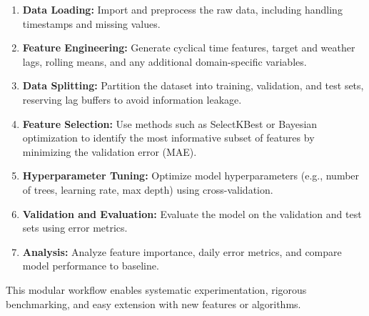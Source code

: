 \begin{enumerate}
    \item \textbf{Data Loading:} Import and preprocess the raw data, including handling timestamps and missing values.
    \item \textbf{Feature Engineering:} Generate cyclical time features, target and weather lags, 
    rolling means, and any additional domain-specific variables.
    \item \textbf{Data Splitting:} Partition the dataset into training, validation, and test sets, 
    reserving lag buffers to avoid information leakage.
    \item \textbf{Feature Selection:} Use methods such as SelectKBest or Bayesian optimization 
    to identify the most informative subset of features by minimizing the validation error (MAE).
    \item \textbf{Hyperparameter Tuning:} Optimize model hyperparameters (e.g., number of trees, 
    learning rate, max depth) using cross-validation.
    \item \textbf{Validation and Evaluation:} Evaluate the model on the validation and test sets using error metrics.
    \item \textbf{Analysis:} Analyze feature importance, daily error metrics, and compare model performance to baseline.
\end{enumerate}

This modular workflow enables systematic experimentation, rigorous benchmarking, and easy 
extension with new features or algorithms.

